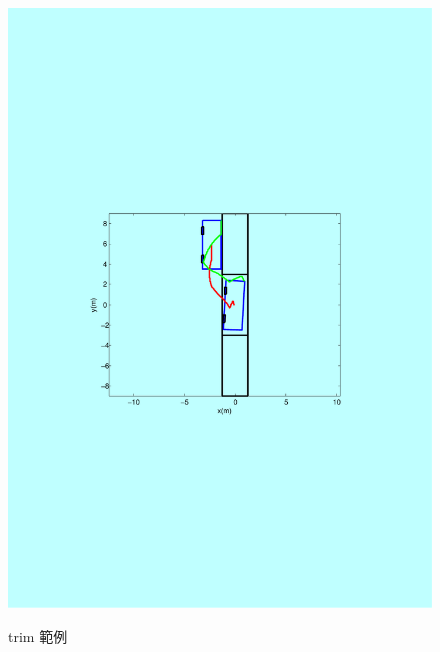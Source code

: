 \documentclass[12pt,a4paper]{report}
\begin{document}
\begin{CJK}{UTF8}{bkai}
\begin{figure}[!h]
{\includegraphics[trim=1.5cm 6.5cm 1.5cm 8.5cm,clip,scale=0.3]{./pics/matlab_example.pdf}}
\caption{trim 範例}
\end{figure}

\vspace{-1cm}

\end{CJK}
\end{document}
